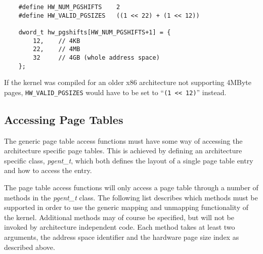 \documentclass[a4paper,twoside]{book}
\newcommand{\Type}[1]{\emph{#1}}
\newcommand{\Var}[1]{\texttt{#1}}
\begin{document}
{\small
\begin{verbatim}
    #define HW_NUM_PGSHIFTS    2
    #define HW_VALID_PGSIZES   ((1 << 22) + (1 << 12))

    dword_t hw_pgshifts[HW_NUM_PGSHIFTS+1] = {
        12,    // 4KB
        22,    // 4MB
        32     // 4GB (whole address space)
    };
\end{verbatim}
}

If the kernel was compiled for an older x86 architecture not
supporting 4MByte pages, \Var{HW\_VALID\_PGSIZES} would have to be set
to ``\texttt{(1~<<~12)}'' instead.


\subsection{Accessing Page Tables}

The generic page table access functions must have some way of
accessing the architecture specific page tables.  This is achieved by
defining an architecture specific class, \Type{pgent\_t}, which both
defines the layout of a single page table entry and how to access the
entry.

The page table access functions will only access a page table through
a number of methods in the \Type{pgent\_t} class.  The following list
describes which methods must be supported in order to use the generic
mapping and unmapping functionality of the kernel.  Additional methods
may of course be specified, but will not be invoked by architecture
independent code.  Each method takes at least two arguments, the
address space identifier and the hardware page size index as described
above.
\end{document}
